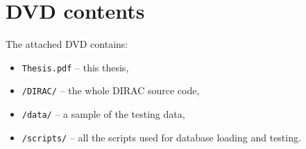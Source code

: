 \chapter{DVD contents} \label{app:dvd}

The attached DVD contains:

\begin{itemize}
	\item \texttt{Thesis.pdf} -- this thesis,
	\item \texttt{/DIRAC/} -- the whole DIRAC source code,
	\item \texttt{/data/} -- a sample of the testing data,
	\item \texttt{/scripts/} -- all the scripts used for database loading and testing.
\end{itemize}